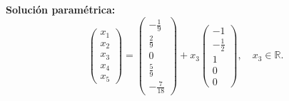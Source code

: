 \begin{prob}
\begin{enumerate}[$a)$]
\begin{myproof}
    \textbf{Solución paramétrica:}
    \[
    \begin{pmatrix} x_1 \\ x_2 \\ x_3 \\ x_4 \\ x_5 \end{pmatrix} = 
    \begin{pmatrix} -\frac{1}{9} \\ \frac{2}{9} \\ 0 \\ \frac{5}{9} \\ -\frac{7}{18} \end{pmatrix} + 
    x_3 \begin{pmatrix} -1 \\ -\frac{1}{2} \\ 1 \\ 0 \\ 0 \end{pmatrix}, \quad x_3 \in \mathbb{R}.
    \]
    \end{myproof}
    \end{enumerate}
\end{prob}

